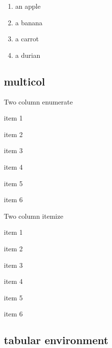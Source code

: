 \documentclass[11pt,a4paper]{report}
\theoremstyle{remark}
\theoremstyle{definition}
\begin{document}
					\begin{enumerate}[label=(\roman*)]
						\item an apple
						\item a banana
						\item a carrot
						\item a durian
					\end{enumerate}
			
			\subsection*{multicol}
				
				\textsf{Two column enumerate}
				\begin{multienum}
					\item item 1
					\item item 2
					\item item 3
					\item item 4
					\item item 5
					\item item 6
				\end{multienum}
				
				\textsf{Two column itemize}
				\begin{multiitem}
					\item item 1
					\item item 2
					\item item 3
					\item item 4
					\item item 5
					\item item 6
				\end{multiitem}
			
			\subsection*{tabular environment}	%
			
\end{document}
